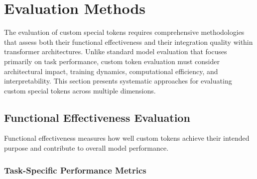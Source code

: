 
\section{Evaluation Methods}

The evaluation of custom special tokens requires comprehensive methodologies that assess both their functional effectiveness and their integration quality within transformer architectures. Unlike standard model evaluation that focuses primarily on task performance, custom token evaluation must consider architectural impact, training dynamics, computational efficiency, and interpretability. This section presents systematic approaches for evaluating custom special tokens across multiple dimensions.
\begin{comment}
Feedback: Before diving into the specifics, it's helpful to establish the core questions a good evaluation should answer. For example: "A robust evaluation framework for a custom token should answer three key questions:
1.  **Does it work?** (Ablation Studies): Does the token actually improve performance on the target task compared to a model without it?
2.  **Is it learning what we think it's learning?** (Probing Tasks): Does the token's embedding actually encode the specific information we designed it to capture?
3.  **How does it change the model's behavior?** (Behavioral Analysis): How does the token affect the model's attention patterns and internal representations?"
\end{comment}

\subsection{Functional Effectiveness Evaluation}

Functional effectiveness measures how well custom tokens achieve their intended purpose and contribute to overall model performance.

\subsubsection{Task-Specific Performance Metrics}

